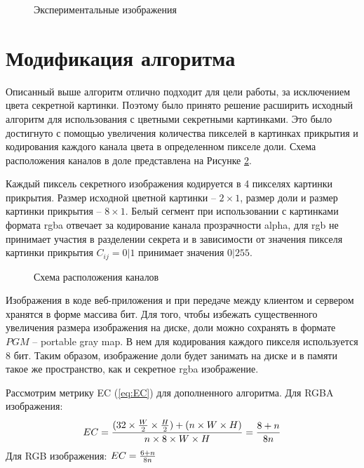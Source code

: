 \documentclass[a4paper,article,14pt]{extarticle}
\begin{document}
\begin{figure}[ph!]
\begin{minipage}[h]{0.3\linewidth}
    \end{minipage}
    \caption{Экспериментальные изображения}
    \label{fig:experimental_grey_images}
\end{figure}

\newpage
\section{Модификация алгоритма}

Описанный выше алгоритм отлично подходит для цели работы, за исключением цвета секретной картинки. Поэтому
было принято решение расширить исходный алгоритм для использования с цветными секретными картинками. 
Это было достигнуто с помощью увеличения количества пикселей в картинках прикрытия и кодирования каждого канала цвета 
в определенном пикселе доли. Схема расположения каналов в доле представлена на Рисунке \ref{fig:channels}. 

Каждый пиксель секретного изображения кодируется в 4 пикселях картинки прикрытия.
Размер исходной цветной картинки -- $2\times 1$, размер доли и размер картинки прикрытия -- $8 \times 1$.
Белый сегмент при использовании с картинками формата rgba отвечает за кодирование канала прозрачности alpha,
для rgb не принимает участия в разделении секрета и в зависимости от значения пикселя картинки прикрытия $C_{ij} = 0 | 1$ принимает значения $0 | 255$.

\begin{figure}[h!]
    \caption{Схема расположения каналов}
    \label{fig:channels}
\end{figure}

Изображения в коде веб-приложения и при передаче между клиентом и сервером хранятся в форме массива бит. 
Для того, чтобы избежать существенного увеличения размера изображения на диске, доли можно сохранять в формате $PGM$ -- portable gray map. В нем для 
кодирования каждого пикселя используется 8 бит. Таким образом, изображение доли будет занимать на диске и в памяти такое же пространство, как и секретное rgba изображение.

Рассмотрим метрику EC (\ref{eq:EC}) для дополненного алгоритма. Для RGBA изображения: 
$$EC = {{(32 \times {W \over 2} \times {H \over 2}) + (n \times W \times H)} \over
{n \times 8 \times W \times H}} = {8+n \over 8n}$$
Для RGB изображения:
$EC = {6+n \over 8n}$
\end{document}
